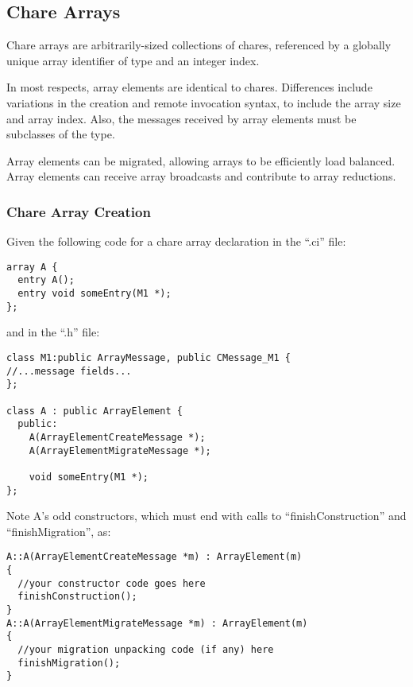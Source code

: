 \subsection{Chare Arrays}

Chare arrays  are arbitrarily-sized collections of chares,
referenced by a globally unique array identifier of type 
 and an integer index. 

In most respects, array elements are identical to chares.  Differences
include variations in the creation and remote invocation syntax, to
include the array size and array index.  Also, the messages received by
array elements must be subclasses of the 
 type.

Array elements can be migrated, allowing arrays to be efficiently
load balanced.  Array elements can receive array broadcasts and
contribute to array reductions.

\subsubsection{Chare Array Creation}

Given the following code for a chare array declaration in the ``.ci'' file:

\begin{verbatim}
array A {
  entry A();
  entry void someEntry(M1 *);
};
\end{verbatim}

and in the ``.h'' file:

\begin{verbatim}
class M1:public ArrayMessage, public CMessage_M1 {
//...message fields...
};

class A : public ArrayElement {
  public:
    A(ArrayElementCreateMessage *);
    A(ArrayElementMigrateMessage *);

    void someEntry(M1 *);
};
\end{verbatim}

Note A's odd constructors, which must end with calls 
to ``finishConstruction'' and ``finishMigration'', as:

\begin{verbatim}
A::A(ArrayElementCreateMessage *m) : ArrayElement(m)
{
  //your constructor code goes here
  finishConstruction();
}
A::A(ArrayElementMigrateMessage *m) : ArrayElement(m)
{
  //your migration unpacking code (if any) here
  finishMigration();
}
\end{verbatim}

